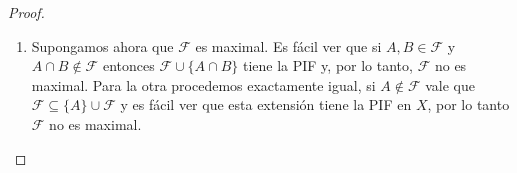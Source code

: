 \documentclass{article}
\theoremstyle{plain}
\theoremstyle{definition}
\begin{document}
\begin{proof}
\begin{enumerate}
              Al tener \( \mathcal{U} \in P \) y ser \( \mathcal{A}_i \subseteq \mathcal{U} \) para todo \( i \in I \), resulta que \( \mathcal{U} \) es cota superior de la cadena \( C \).

              Como toda cadena en \( P \) está acotada superiormente, por el Lema de Zorn, el conjunto \( P \) posee un elemento maximal \( \mathcal{M} \).

              Por pertenecer a \( P \), \( \mathcal{M} \) es una familia con la PIF que contiene a \( \mathcal{F} \). Por ser maximal en \( P \), es una familia maximal con la PIF (si existiera una familia más grande con la PIF, esta también contendría a \( \mathcal{F} \), estaría en \( P \) y contradiría la maximalidad de \( \mathcal{M} \)).
        \item Supongamos ahora que \( \mathcal{F} \) es maximal. Es fácil ver que si \( A, B \in \mathcal{F} \) y \( A \cap B \notin \mathcal{F} \) entonces \( \mathcal{F} \cup \{ A \cap B \} \) tiene la PIF y, por lo tanto, \( \mathcal{F} \) no es maximal.
              Para la otra procedemos exactamente igual, si \( A \notin \mathcal{F} \) vale que \( \mathcal{F} \subseteq \{ A \} \cup \mathcal{F} \) y es fácil ver que esta extensión tiene la PIF en \( X \), por lo tanto \( \mathcal{F} \) no es maximal.
    \end{enumerate}
\end{proof}
\end{document}
